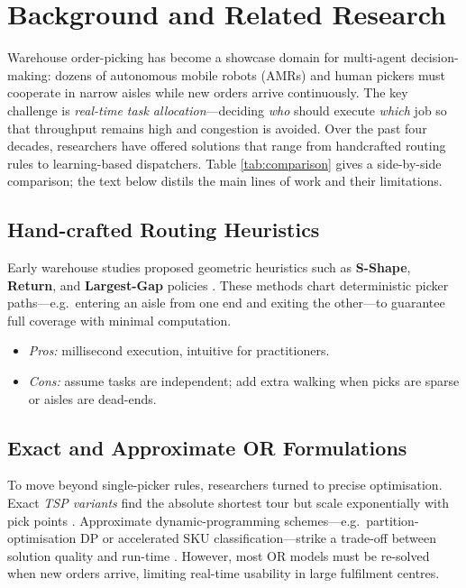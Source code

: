 \documentclass[journal,onecolumn]{IEEEtran}
\begin{document}
\section{Background and Related Research}

Warehouse order-picking has become a showcase domain for multi-agent decision-making: dozens of autonomous mobile robots (AMRs) and human pickers must cooperate in narrow aisles while new orders arrive continuously.  The key challenge is \emph{real-time task allocation}—deciding \textit{who} should execute \textit{which} job so that throughput remains high and congestion is avoided.  Over the past four decades, researchers have offered solutions that range from handcrafted routing rules to learning-based dispatchers.  Table \ref{tab:comparison} gives a side-by-side comparison; the text below distils the main lines of work and their limitations.

\subsection{Hand-crafted Routing Heuristics}
Early warehouse studies proposed geometric heuristics such as \textbf{S-Shape}, \textbf{Return}, and \textbf{Largest-Gap} policies \citep{ratliff1983sshape}.  
These methods chart deterministic picker paths—e.g.\ entering an aisle from one end and exiting the other—to guarantee full coverage with minimal computation.  
\vspace{-2pt}
\begin{itemize}[leftmargin=1.5em]
  \item[] \textit{Pros:} millisecond execution, intuitive for practitioners.  
  \item[] \textit{Cons:} assume tasks are independent; add extra walking when picks are sparse or aisles are dead-ends.
\end{itemize}

\subsection{Exact and Approximate OR Formulations}
To move beyond single-picker rules, researchers turned to precise optimisation.  
Exact \emph{TSP variants} find the absolute shortest tour but scale exponentially with pick points \citep{de_koster1997optimal}.  
Approximate dynamic-programming schemes—e.g.\ partition-optimisation DP or accelerated SKU classification—strike a trade-off between solution quality and run-time \citep{saylam2022partition,rao2023accelerated}.  
However, most OR models must be re-solved when new orders arrive, limiting real-time usability in large fulfilment centres.
\end{document}
